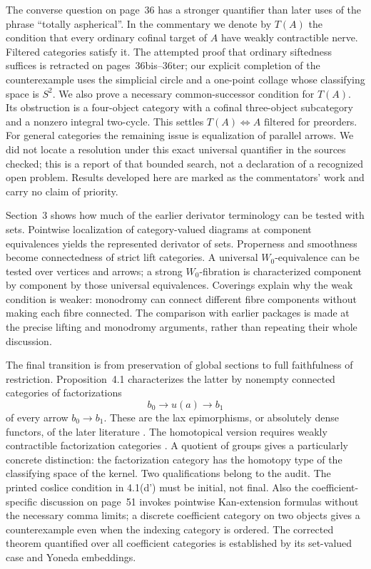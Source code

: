 The converse question on page~36 has a stronger quantifier than later uses of the phrase ``totally aspherical''. In the commentary we denote by $T(A)$ the condition that every ordinary cofinal target of $A$ have weakly contractible nerve. Filtered categories satisfy it. The attempted proof that ordinary siftedness suffices is retracted on pages~36bis--36ter; our explicit completion of the counterexample uses the simplicial circle and a one-point collage whose classifying space is $S^2$. We also prove a necessary common-successor condition for $T(A)$. Its obstruction is a four-object category with a cofinal three-object subcategory and a nonzero integral two-cycle. This settles $T(A)\Leftrightarrow A\text{ filtered}$ for preorders. For general categories the remaining issue is equalization of parallel arrows. We did not locate a resolution under this exact universal quantifier in the sources checked; this is a report of that bounded search, not a declaration of a recognized open problem. Results developed here are marked as the commentators' work and carry no claim of priority.

Section~3 shows how much of the earlier derivator terminology can be tested with sets. Pointwise localization of category-valued diagrams at component equivalences yields the represented derivator of sets. Properness and smoothness become connectedness of strict lift categories. A universal $W_0$-equivalence can be tested over vertices and arrows; a strong $W_0$-fibration is characterized component by component by those universal equivalences. Coverings explain why the weak condition is weaker: monodromy can connect different fibre components without making each fibre connected. The comparison with earlier packages is made at the precise lifting and monodromy arguments, rather than repeating their whole discussion.

The final transition is from preservation of global sections to full faithfulness of restriction. Proposition~4.1 characterizes the latter by nonempty connected categories of factorizations
\[
 b_0\longrightarrow u(a)\longrightarrow b_1
\]
of every arrow $b_0\to b_1$. These are the lax epimorphisms, or absolutely dense functors, of the later literature \citep{AdamekElBashirSobralVelebil2001}. The homotopical version requires weakly contractible factorization categories \citep[Theorem~6.10]{GrothStovicek2016Trees}. A quotient of groups gives a particularly concrete distinction: the factorization category has the homotopy type of the classifying space of the kernel. Two qualifications belong to the audit. The printed coslice condition in 4.1(d') must be initial, not final. Also the coefficient-specific discussion on page~51 invokes pointwise Kan-extension formulas without the necessary comma limits; a discrete coefficient category on two objects gives a counterexample even when the indexing category is ordered. The corrected theorem quantified over all coefficient categories is established by its set-valued case and Yoneda embeddings.

